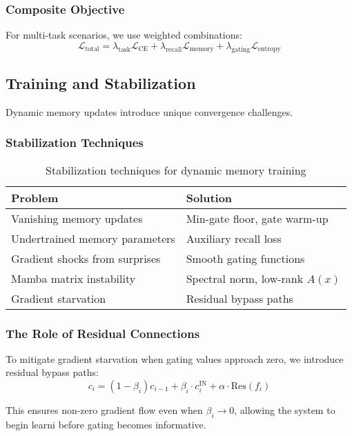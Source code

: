 \subsubsection{Composite Objective}
For multi-task scenarios, we use weighted combinations:
\begin{equation}
\mathcal{L}_{\text{total}} = \lambda_{\text{task}} \mathcal{L}_{\text{CE}} + \lambda_{\text{recall}} \mathcal{L}_{\text{memory}} + \lambda_{\text{gating}} \mathcal{L}_{\text{entropy}}
\end{equation}

\subsection{Training and Stabilization}
Dynamic memory updates introduce unique convergence challenges.

\subsubsection{Stabilization Techniques}
%
\begin{table}[h]
\centering
\begin{tabular}{@{}ll@{}}
\toprule
\textbf{Problem} & \textbf{Solution} \\
\midrule
Vanishing memory updates & Min-gate floor, gate warm-up \\
Undertrained memory parameters & Auxiliary recall loss \\
Gradient shocks from surprises & Smooth gating functions \\
Mamba matrix instability & Spectral norm, low-rank $A(x)$ \\
Gradient starvation & Residual bypass paths \\
\bottomrule
\end{tabular}
\caption{Stabilization techniques for dynamic memory training}
\label{tab:stabilization}
\end{table}

\subsubsection{The Role of Residual Connections}
To mitigate gradient starvation when gating values approach zero, we introduce residual bypass paths:
\begin{equation}
c_i = (1 - \beta_i) c_{i-1} + \beta_i \cdot c^{\text{IN}}_i + \alpha \cdot \text{Res}(f_i)
\end{equation}

This ensures non-zero gradient flow even when $\beta_i \to 0$, allowing the system to begin learni before gating becomes informative.
